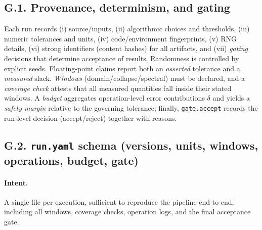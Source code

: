 \documentclass[11pt]{article}
\numberwithin{equation}{section}
\theoremstyle{definition}
\begin{document}
\subsection*{G.1. Provenance, determinism, and gating}
Each run records (i) source/inputs, (ii) algorithmic choices and thresholds, (iii) numeric
tolerances and units, (iv) code/environment fingerprints, (v) RNG details, (vi) strong identifiers
(content hashes) for all artifacts, and (vii) \emph{gating} decisions that determine acceptance of results.
Randomness is controlled by explicit seeds. Floating-point claims report both an \emph{asserted} tolerance
and a \emph{measured} slack. \emph{Windows} (domain/collapse/spectral) must be declared, and a
\emph{coverage check} attests that all measured quantities fall inside their stated windows.
A \emph{budget} aggregates operation-level error contributions \(\delta\) and yields a
\emph{safety margin} relative to the governing tolerance; finally, \texttt{gate.accept} records the run-level
decision (accept/reject) together with reasons.

\subsection*{G.2. \texttt{run.yaml} schema (versions, units, windows, operations, budget, gate)}
\paragraph{Intent.} A single file per execution, sufficient to reproduce the pipeline end-to-end, including
all windows, coverage checks, operation logs, and the final acceptance gate.
\end{document}
